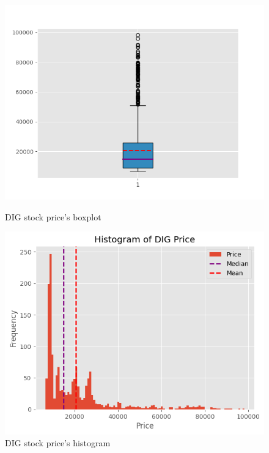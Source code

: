 \documentclass{ieeeojies}
\begin{document}
\begin{figure}[H]
    \centering
    \begin{minipage}{0.23\textwidth}
    \centering
    \includegraphics[width=1\textwidth]{Boxplot_DIG.png}
    \caption{DIG stock price's boxplot}
    \label{fig:1}
    \end{minipage}
    \hfill
    \begin{minipage}{0.23\textwidth}
    \centering
    \includegraphics[width=1\textwidth]{Histogram DIG.png}
    \caption{DIG stock price's histogram}
    \label{fig:2}
    \end{minipage}
\end{figure}
\end{document}
